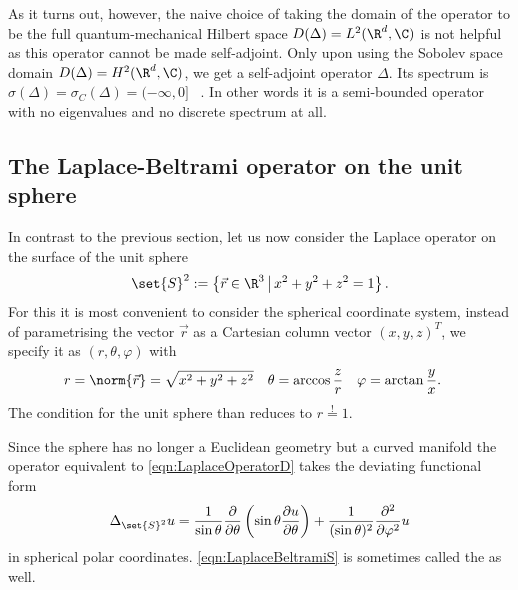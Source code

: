 As it turns out, however,
the naive choice of taking the domain of the operator to be the full
quantum-mechanical Hilbert space $D(\Delta) = L^2(\R^d, \C)$
is not helpful as this operator cannot be made self-adjoint.
Only upon using the Sobolev space domain $D(\Delta) = H^2(\R^d, \C)$,
we get a self-adjoint operator $\Delta$.
Its spectrum is $\sigma(\Delta) = \sigma_C(\Delta) = (-\infty, 0]$%
~\cite[example 3.2.2]{Davies2007}.
In other words it is a semi-bounded operator with no eigenvalues and no
discrete spectrum at all.

\subsection{The Laplace-Beltrami operator on the unit sphere}
\label{sec:SpectrumLaplaceBeltrami}

In contrast to the previous section,
let us now consider the Laplace operator on the surface of the unit sphere
\[
	\set{S}^2 := \left\{ \vec{r} \in \R^3 \, \middle| \, x^2 + y^2 + z^2 = 1 \right\}.
\]
For this it is most convenient to consider
the spherical coordinate system,
\ie instead of parametrising the vector $\vec{r}$ as a
Cartesian column vector $(x, y, z)^T$,
we specify it as $(r, \theta, \varphi)$ with
\begin{align*}
	r &= \norm{\vec{r}} = \sqrt{x^2+y^2+z^2} & \theta &= \arccos\frac{z}{r} & \varphi &= \arctan\frac{y}{x}.
\end{align*}
The condition for the unit sphere than reduces to $r\stackrel{!}{=}1$.

Since the sphere has no longer a Euclidean geometry
but a curved manifold
the operator equivalent to \eqref{eqn:LaplaceOperatorD} takes
the deviating functional form
\newcommand{\laplaceSphere}{\Delta_{\set{S}^2}}
\begin{equation}
	\laplaceSphere  u = \frac{1}{\sin \theta} \frac{\partial}{\partial \theta}
\left( \sin \theta \frac{\partial u}{\partial \theta}  \right)
+ \frac{1}{(\sin \theta)^2} \frac{\partial^2}{\partial \varphi^2} u
	\label{eqn:LaplaceBeltramiS}
\end{equation}
in spherical polar coordinates.
\eqref{eqn:LaplaceBeltramiS} is sometimes called the
 as well.

